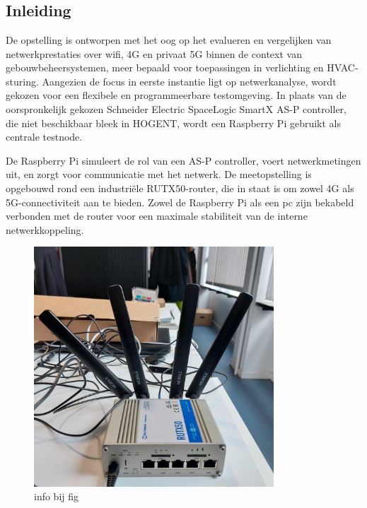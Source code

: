 \chapter{}%
\label{ch:basisopstelling}

\section{Inleiding}

De opstelling is ontworpen met het oog op het evalueren en vergelijken van netwerkprestaties over wifi, 4G en privaat 5G binnen de context van gebouwbeheersystemen, meer bepaald voor toepassingen in verlichting en HVAC-sturing.
Aangezien de focus in eerste instantie ligt op netwerkanalyse, wordt gekozen voor een flexibele en programmeerbare testomgeving. In plaats van de oorspronkelijk gekozen Schneider Electric SpaceLogic SmartX AS-P controller, die niet beschikbaar bleek in HOGENT, wordt een Raspberry Pi gebruikt als centrale testnode.


De Raspberry Pi simuleert de rol van een AS-P controller, voert netwerkmetingen uit, en zorgt voor communicatie met het netwerk. De meetopstelling is opgebouwd rond een industriële RUTX50-router, die in staat is om zowel 4G als 5G-connectiviteit aan te bieden. Zowel de Raspberry Pi als een pc zijn bekabeld verbonden met de router voor een maximale stabiliteit van de interne netwerkkoppeling.

\begin{figure}
    \includegraphics[width=0.8\textwidth]{../graphics/RUTX50.jpg}
    \caption[router]{\label{fig:router}info bij fig}
\end{figure}

